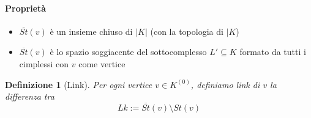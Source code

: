 \documentclass[a4paper]{report}
\newtheorem{definition}{Definizione}
\newcommand{\cstar}[1]{\ensuremath{\overline{St}({#1})}}
\begin{document}
\paragraph{Proprietà}
\begin{itemize}
    \item \cstar{v} è un insieme chiuso di $|K|$ (con la topologia di $|K$)
    \item \cstar{v} è lo spazio soggiacente del sottocomplesso $L'\subseteq K$ formato da tutti i cimplessi con $v$ come vertice
\end{itemize}
\begin{definition}[Link]
    Per ogni vertice $v\in K^{(0)}$, definiamo link di $v$ la differenza tra
    \[
        Lk:=\cstar{v}\setminus St(v)
    \]
\end{definition}
\begin{center}



    \begin{tikzpicture}[x=0.75pt,y=0.75pt,yscale=-1,xscale=1]


\end{tikzpicture}
\end{center}
\end{document}

